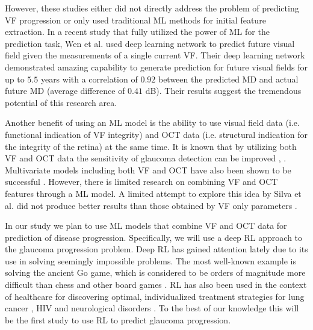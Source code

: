 However, these studies either did not directly address the problem of predicting \acl{VF} progression or only used traditional \ac{ML} methods for initial feature extraction. In a recent study that fully utilized the power of \ac{ML} for the prediction task, Wen et al. \cite{Wen2018} used deep learning network to predict future visual field given the measurements of a single current \acl{VF}. Their deep learning network demonstrated amazing capability to generate prediction for future visual fields for up to $5.5$ years with a correlation of $0.92$ between the predicted \ac{MD} and actual future \ac{MD} (average difference of $0.41$ dB). Their results suggest the tremendous potential of this research area. 

Another benefit of using an \ac{ML} model is the ability to use visual field data (i.e. functional indication of \acl{VF} integrity) and \ac{OCT} data (i.e. structural indication for the integrity of the retina) at the same time. It is known that by utilizing both \acl{VF} and \ac{OCT} data the sensitivity of glaucoma detection can be improved \cite{Shah2006}, \cite{Lu2008}. Multivariate models including both \acl{VF} and \ac{OCT} have also been shown to be successful \cite{Mwanza2013}. However, there is limited research on combining \acl{VF} and \ac{OCT} features through a \ac{ML} model. A limited attempt to explore this idea by Silva et al. did not produce better results than those obtained by \acl{VF} only parameters \cite{Silva2013}. 

In our study we plan to use \ac{ML} models that combine \acl{VF} and \ac{OCT} data for prediction of disease progression.  Specifically, we will use a deep \ac{RL} approach to the glaucoma progression problem. Deep RL has gained attention lately due to its use in solving seemingly impossible problems. The most well-known example is solving the ancient Go game, which is considered to be orders of magnitude more difficult than chess and other board games \cite{Silver2016}. \ac{RL} has also been used in the context of healthcare for discovering optimal, individualized treatment strategies for lung cancer \cite{Zhao2009}\cite{Zhao2011}, HIV \cite{Ernst2006} and neurological disorders \cite{Shortreed2011}. To the best of our knowledge this will be the first study to use \ac{RL} to predict glaucoma progression. 

